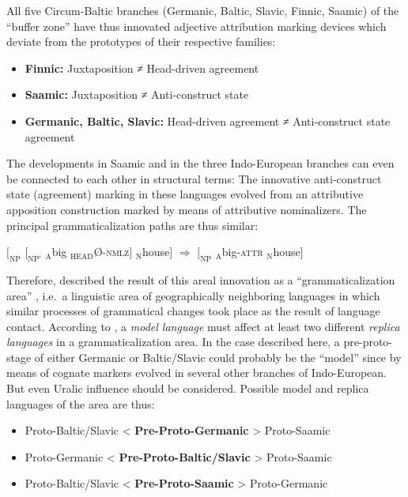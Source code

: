 All five Circum-Baltic branches (Germanic, Baltic, Slavic, Finnic, Saamic) of the “buffer zone” have thus innovated adjective attribution marking devices which deviate from the prototypes of their respective families:
\begin{itemize}
\item	\textbf{Finnic:}
\subitem Juxtaposition ≠ Head\hyp{}driven agreement
\item	\textbf{Saamic:}
\subitem Juxtaposition ≠ Anti\hyp{}construct state
\item	\textbf{Germanic, Baltic, Slavic:}
\subitem Head\hyp{}driven agreement ≠ Anti\hyp{}construct state agreement
\end{itemize}
The developments in Saamic and in the three Indo-European branches can even be connected to each other in structural terms: The innovative anti\hyp{}construct state (agreement) marking in these languages evolved from an attributive apposition construction marked by means of attributive nominalizers. The principal grammaticalization paths are thus similar:
\begin{exe}
\ex $[_{\text{NP}}$ $[_{\text{NP'}}$ $_{\text{A}}$big $_{\text{HEAD}}$Ø-\textsc{nmlz}$]$ $_{\text{N}}$house$]$ $\Rightarrow$ $[_{\text{NP}}$ $_{\text{A}}$big-\textsc{attr} $_{\text{N}}$house$]$
\end{exe}
Therefore, \citet[271]{riesler2006a} described the result of this areal innovation as a “grammaticalization area” \citep{heine-etal2005}, i.e.~a linguistic area of geographically neighboring languages in which similar processes of grammatical changes took place as the result of language contact. According to \citet{heine-etal2005}, a \textit{model language} must affect at least two different \textit{replica languages} in a grammaticalization area. In the case described here, a pre-proto-stage of either Germanic or Baltic\slash{}Slavic could probably be the “model” since  by means of cognate markers evolved in several other branches of Indo-European. But even Uralic influence should be considered. Possible model and replica languages of the area are thus:
\begin{itemize}
\item	\begin{center}Proto\hyp{}Baltic\slash{}Slavic < \textbf{Pre-Proto\hyp{}Germanic} > Proto\hyp{}Saamic\end{center}
\item	\begin{center}Proto\hyp{}Germanic < \textbf{Pre-Proto\hyp{}Baltic\slash{}Slavic} > Proto\hyp{}Saamic\end{center}
\item \begin{center}Proto\hyp{}Baltic\slash{}Slavic < \textbf{Pre-Proto\hyp{}Saamic} > Proto\hyp{}Germanic\end{center}
\end{itemize}
